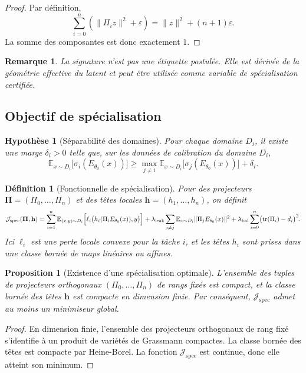 \documentclass[11pt,a4paper]{article}
\newtheorem{definition}{Définition}[section]
\newtheorem{assumption}{Hypothèse}[section]
\newtheorem{proposition}{Proposition}[section]
\newtheorem{remark}{Remarque}[section]
\newcommand{\1}{\mathbf 1}
\begin{document}
\begin{proof}
Par définition,
\[
\sum_{i=0}^n(\|\Pi_i z\|^2+\varepsilon)
=
\|z\|^2+(n+1)\varepsilon.
\]
La somme des composantes est donc exactement \(1\).
\end{proof}

\begin{remark}
La signature n'est pas une étiquette postulée.  
Elle est dérivée de la géométrie effective du latent et peut être utilisée comme variable de spécialisation certifiée.
\end{remark}

\subsection{Objectif de spécialisation}

\begin{assumption}[Séparabilité des domaines]
Pour chaque domaine \(D_i\), il existe une marge \(\delta_i>0\) telle que, sur les données de calibration du domaine \(D_i\),
\[
\mathbb E_{x\sim D_i}\bigl[\sigma_i(E_{\theta_0}(x))\bigr]
\ge
\max_{j\neq i}\mathbb E_{x\sim D_i}\bigl[\sigma_j(E_{\theta_0}(x))\bigr]
+\delta_i.
\]
\end{assumption}

\begin{definition}[Fonctionnelle de spécialisation]
Pour des projecteurs \(\mathbf \Pi=(\Pi_0,\dots,\Pi_n)\) et des têtes locales \(\mathbf h=(h_1,\dots,h_n)\), on définit
\[
\mathcal J_{\mathrm{spec}}(\mathbf\Pi,\mathbf h)
=
\sum_{i=1}^n
\mathbb E_{(x,y)\sim D_i}
\Bigl[
\ell_i\bigl(h_i(\Pi_i E_{\theta_0}(x)),y\bigr)
\Bigr]
+
\lambda_{\mathrm{leak}}
\sum_{i\neq j}
\mathbb E_{x\sim D_i}\|\Pi_j E_{\theta_0}(x)\|^2
+
\lambda_{\mathrm{bal}}
\sum_{i=0}^n
\bigl(\operatorname{tr}(\Pi_i)-d_i\bigr)^2.
\]
Ici \(\ell_i\) est une perte locale convexe pour la tâche \(i\), et les têtes \(h_i\) sont prises dans une classe bornée de maps linéaires ou affines.
\end{definition}

\begin{proposition}[Existence d'une spécialisation optimale]
L'ensemble des tuples de projecteurs orthogonaux \((\Pi_0,\dots,\Pi_n)\) de rangs fixés est compact, et la classe bornée des têtes \(\mathbf h\) est compacte en dimension finie.  
Par conséquent, \(\mathcal J_{\mathrm{spec}}\) admet au moins un minimiseur global.
\end{proposition}

\begin{proof}
En dimension finie, l'ensemble des projecteurs orthogonaux de rang fixé s'identifie à un produit de variétés de Grassmann compactes.  
La classe bornée des têtes est compacte par Heine-Borel.  
La fonction \(\mathcal J_{\mathrm{spec}}\) est continue, donc elle atteint son minimum.
\end{proof}
\end{document}
